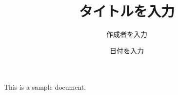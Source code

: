 \documentclass[dvipdfmx]{jsarticle}
\begin{document}
\title{タイトルを入力}
\author{作成者を入力}
\date{日付を入力}
\maketitle

This is a sample document.
\end{document}
